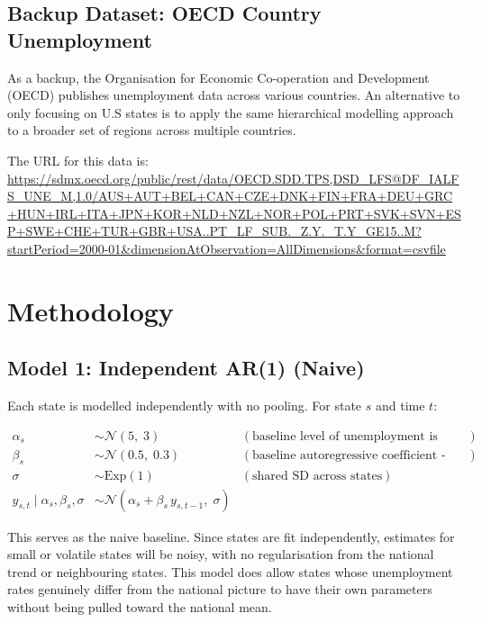 \documentclass[11pt]{article}
\begin{document}
\subsection{Backup Dataset: OECD Country Unemployment}

As a backup, the Organisation for Economic Co-operation and Development (OECD) publishes
unemployment data across various countries. An alternative to only focusing on U.S states is to
apply the same hierarchical modelling approach to a broader set of regions across multiple countries.


The URL for this data is: \\
\url{https://sdmx.oecd.org/public/rest/data/OECD.SDD.TPS,DSD_LFS@DF_IALFS_UNE_M,1.0/AUS+AUT+BEL+CAN+CZE+DNK+FIN+FRA+DEU+GRC+HUN+IRL+ITA+JPN+KOR+NLD+NZL+NOR+POL+PRT+SVK+SVN+ESP+SWE+CHE+TUR+GBR+USA..PT_LF_SUB._Z.Y._T.Y_GE15..M?startPeriod=2000-01&dimensionAtObservation=AllDimensions&format=csvfile
}

\section{Methodology}

\subsection{Model 1: Independent AR(1) (Naive)}

Each state is modelled independently with no pooling. For state $s$ and
time $t$:

\begin{align*}
  \alpha_s &\sim \mathcal{N}(5,\; 3) & (\text{baseline level of unemployment is around 5\%}) \\
  \beta_s  &\sim \mathcal{N}(0.5,\; 0.3) & (\text{baseline autoregressive coefficient - moderate persistence}) \\
  \sigma   &\sim \mathrm{Exp}(1)  & (\text{shared SD across states}) \\[4pt]
  y_{s,t} \mid \alpha_s, \beta_s, \sigma
           &\sim \mathcal{N}\!\left(\alpha_s + \beta_s\, y_{s,t-1},\; \sigma\right)
\end{align*}

This serves as the naive baseline. Since states are fit independently,
estimates for small or volatile states will be noisy, with no
regularisation from the national trend or neighbouring states. 
This model does allow states whose unemployment rates genuinely
differ from the national picture to have their 
own parameters without being pulled toward the national mean.
\end{document}
